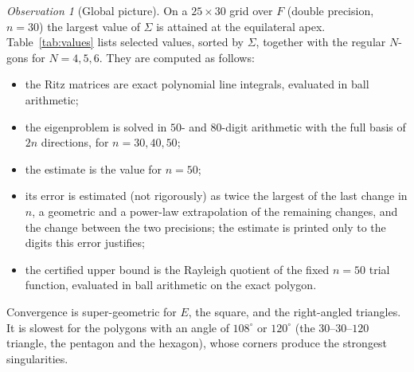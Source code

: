 \documentclass[11pt]{article}
\theoremstyle{definition}
\theoremstyle{remark}
\newtheorem{observation}[theorem]{Observation}
\begin{document}
\begin{observation}[Global picture]
On a $25\times30$ grid over $F$ (double precision, $n=30$) the largest value of $\Sigma$ is attained at the
equilateral apex. Table~\ref{tab:values} lists selected values, sorted by $\Sigma$, together with the regular
$N$-gons for $N=4,5,6$. They are computed as follows:
\begin{itemize}
\item the Ritz matrices are exact polynomial line integrals, evaluated in ball arithmetic;
\item the eigenproblem is solved in $50$- and $80$-digit arithmetic with the full basis of $2n$
directions, for $n=30,40,50$;
\item the estimate is the value for $n=50$;
\item its error is estimated (not rigorously) as twice the largest of the last change in $n$, a geometric
and a power-law extrapolation of the remaining changes, and the change between the two precisions; the
estimate is printed only to the digits this error justifies;
\item the certified upper bound is the Rayleigh quotient of the fixed $n=50$ trial function, evaluated in
ball arithmetic on the exact polygon.
\end{itemize}
Convergence is super-geometric for $E$, the square, and the right-angled triangles. It is slowest for the
polygons with an angle of $108^\circ$ or $120^\circ$ (the $30$--$30$--$120$ triangle, the pentagon and the
hexagon), whose corners produce the strongest singularities.


\end{observation}
\end{document}
